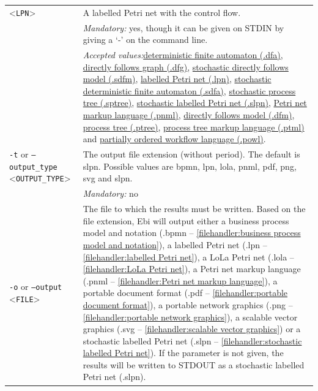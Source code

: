 {\begin{tabularx}{\linewidth}{lX}
<\texttt{LPN}>&A labelled Petri net with the control flow.\\
&\textit{Mandatory:} \quad yes, though it can be given on STDIN by giving a `-' on the command line.\\
&\textit{Accepted values:}\quad \hyperref[filehandler:deterministic finite automaton]{deterministic finite automaton (.dfa)}, \hyperref[filehandler:directly follows graph]{directly follows graph (.dfg)}, \hyperref[filehandler:stochastic directly follows model]{stochastic directly follows model (.sdfm)}, \hyperref[filehandler:labelled Petri net]{labelled Petri net (.lpn)}, \hyperref[filehandler:stochastic deterministic finite automaton]{stochastic deterministic finite automaton (.sdfa)}, \hyperref[filehandler:stochastic process tree]{stochastic process tree (.sptree)}, \hyperref[filehandler:stochastic labelled Petri net]{stochastic labelled Petri net (.slpn)}, \hyperref[filehandler:Petri net markup language]{Petri net markup language (.pnml)}, \hyperref[filehandler:directly follows model]{directly follows model (.dfm)}, \hyperref[filehandler:process tree]{process tree (.ptree)}, \hyperref[filehandler:process tree markup language]{process tree markup language (.ptml)} and \hyperref[filehandler:partially ordered workflow language]{partially ordered workflow language (.powl)}.\\
\texttt{-t} or \texttt{--output\_type} <\texttt{OUTPUT\_TYPE}> &
The output file extension (without period). The default is slpn. Possible values are bpmn, lpn, lola, pnml, pdf, png, svg and slpn.\\
&\textit{Mandatory:} \quad no\\
\texttt{-o} or \texttt{--output} <\texttt{FILE}> &
The file to which the results must be written. Based on the file extension, Ebi will output either a business process model and notation (.bpmn -- \cref{filehandler:business process model and notation}), a labelled Petri net (.lpn -- \cref{filehandler:labelled Petri net}), a LoLa Petri net (.lola -- \cref{filehandler:LoLa Petri net}), a Petri net markup language (.pnml -- \cref{filehandler:Petri net markup language}), a portable document format (.pdf -- \cref{filehandler:portable document format}), a portable network graphics (.png -- \cref{filehandler:portable network graphics}), a scalable vector graphics (.svg -- \cref{filehandler:scalable vector graphics}) or a stochastic labelled Petri net (.slpn -- \cref{filehandler:stochastic labelled Petri net}).
If the parameter is not given, the results will be written to STDOUT as a stochastic labelled Petri net (.slpn).\\

\end{tabularx}}
